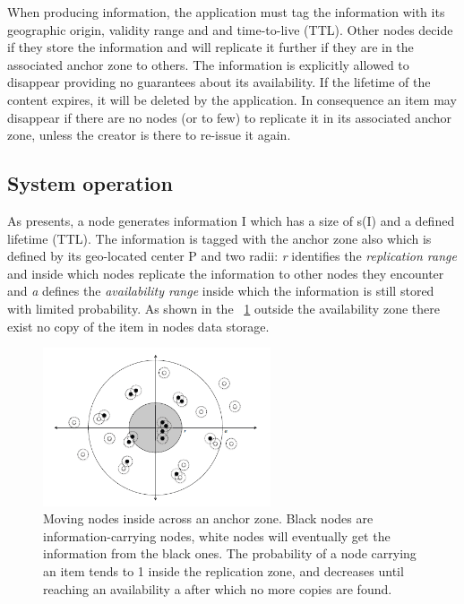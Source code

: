 When producing information, the application must tag the information with its
geographic origin, validity range and and time-to-live (TTL).
Other nodes decide if they store the information and will replicate it further
if they are in the associated anchor zone to others. The information is
explicitly allowed to disappear providing no guarantees about its availability.
If the lifetime of the content expires, it will be deleted by the application.
In consequence an item may disappear if there are no nodes (or to few) to
replicate it in its associated anchor zone, unless the creator is there to
re-issue it again.

\subsection{System operation}

As \cite{percomfloatingcontent} presents, a node generates information I which
has a size of s(I) and a defined lifetime (TTL). The information is tagged with
the anchor zone also which is defined by its geo-located center P and two radii:
{\it r} identifies the {\it replication range} and inside which nodes replicate
the information to other nodes they encounter and {\it a} defines the
{\it availability range} inside which the information is still stored with
limited probability. As shown in the ~\ref{fig:anchor_zone} outside the
availability zone there exist no copy of the item in nodes data storage.

\begin{figure}[bt]
 \centering
 \includegraphics[width=0.6\textwidth]{img/anchor_zone}
 \caption{Moving nodes inside across an anchor zone. Black nodes are
 information-carrying nodes, white nodes will eventually get the information
 from the black ones. The probability of a node carrying an item tends to 1
 inside the replication zone, and decreases until reaching an availability a
 after which no more copies are found. }
 \label{fig:anchor_zone}
\end{figure}

